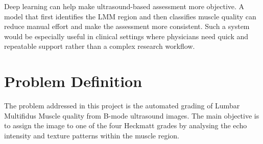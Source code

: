 Deep learning can help make ultrasound-based assessment more objective. A model that first identifies the LMM region and then classifies muscle quality can reduce manual effort and make the assessment more consistent. Such a system would be especially useful in clinical settings where physicians need quick and repeatable support rather than a complex research workflow.


\section{Problem Definition}
\label{problem}
The problem addressed in this project is the automated grading of Lumbar Multifidus Muscle quality from B-mode ultrasound images. The main objective is to assign the image to one of the four Heckmatt grades by analysing the echo intensity and texture patterns within the muscle region.


